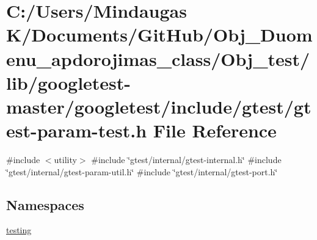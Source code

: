 \hypertarget{_obj__test_2lib_2googletest-master_2googletest_2include_2gtest_2gtest-param-test_8h}{}\section{C\+:/\+Users/\+Mindaugas K/\+Documents/\+Git\+Hub/\+Obj\+\_\+\+Duomenu\+\_\+apdorojimas\+\_\+class/\+Obj\+\_\+test/lib/googletest-\/master/googletest/include/gtest/gtest-\/param-\/test.h File Reference}
\label{_obj__test_2lib_2googletest-master_2googletest_2include_2gtest_2gtest-param-test_8h}
{\ttfamily \#include $<$utility$>$}\newline
{\ttfamily \#include \char`\"{}gtest/internal/gtest-\/internal.\+h\char`\"{}}\newline
{\ttfamily \#include \char`\"{}gtest/internal/gtest-\/param-\/util.\+h\char`\"{}}\newline
{\ttfamily \#include \char`\"{}gtest/internal/gtest-\/port.\+h\char`\"{}}\newline
\subsection*{Namespaces}
\begin{DoxyCompactItemize}
\item 
 \mbox{\hyperlink{namespacetesting}{testing}}
\end{DoxyCompactItemize}
